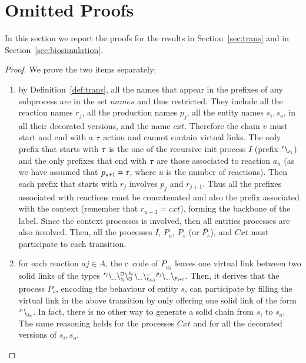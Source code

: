 \newpage

\section{Omitted Proofs}
In this section we report the proofs for the results in Section~\ref{sec:trans} and in Section~\ref{sec:biosimulation}.

\lemmastruct*
\begin{proof}
  We prove the two items separately:
  \begin{enumerate}
\item by Definition~\ref{def:trans}, all the names that appear in the prefixes of any subprocess are in the set $\mathit{names}$ and thus restricted. 
They include all the reaction names $r_j$, all the production names $p_j$, all the entity names $s_i,s_o$, in all their decorated versions, and the name $\mathit{cxt}$. 
Therefore the chain $\upsilon$ must start and end with a $\tau$ action and cannot contain virtual links.
The only prefix that starts with $\tau$ is the one of the recursive init process $I$ (prefix ${}^{\tau} \backslash_{r_1}$) and the only prefixes that end with $\tau$ are those associated to reaction $a_u$ (as we have assumed that $p_{u+1} = \tau$, where $u$ is the number of reactions).
Then each prefix that starts with $r_j$ involves $p_j$ and $r_{j+1}$.
Thus all the prefixes associated with reactions must be concatenated and also the prefix associated with the context (remember that $r_{u+1} = \mathit{cxt}$), forming the backbone of the label.
Since the context processes is involved, then all entities processes are also involved.
Then, all the processes $I$, $P_a$, $P_s$ (or $\overline{P_s}$), and $\mathit{Cxt}$  must participate to each transition.
 \item for each reaction $aj \in A$, the c\CNA \ code of  $P_{aj}$ leaves one virtual link between two solid links of the types ${}^{r_j} \backslash_{\dots} \backslash_{s_{i}}^{\scriptstyle {\square}}\backslash_{\scriptstyle {\square}}^{s_{o}}{}^{} \backslash_{\dots}{}^{} \backslash_{r_{j+1}} ^{\dots}{}^{p_j} \backslash_{\dots}{}^{} \backslash_{p_{j+1}}$. Then, it derives that the process $P_{s}$, encoding the behaviour of entity $s$, can participate by filling the virtual link in the above transition by only offering one solid link of the form ${}^{s_{i}} \backslash_{s_{o}}$. In fact, there is no other way to generate a solid chain from $s_{i}$ to $s_{o}$.
 The same reasoning holds for the processes $\mathit{Cxt}$ and for all the decorated versions of $s_i,s_o$.
   \end{enumerate}
  \end{proof}
  
